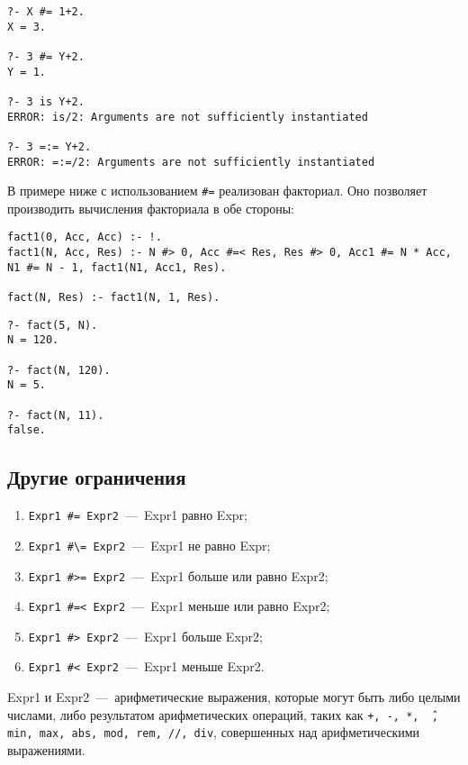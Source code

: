 \begin{lstlisting}[label=div,caption=Пример эквивалетности]
?- X #= 1+2.
X = 3.

?- 3 #= Y+2.
Y = 1.

?- 3 is Y+2.
ERROR: is/2: Arguments are not sufficiently instantiated

?- 3 =:= Y+2.
ERROR: =:=/2: Arguments are not sufficiently instantiated
\end{lstlisting}

В примере ниже с использованием \texttt{\#=} реализован факториал. Оно позволяет производить вычисления факториала в обе стороны:

\begin{lstlisting}[label=div,caption=Реализация факториала]
fact1(0, Acc, Acc) :- !.
fact1(N, Acc, Res) :- N #> 0, Acc #=< Res, Res #> 0, Acc1 #= N * Acc, N1 #= N - 1, fact1(N1, Acc1, Res).

fact(N, Res) :- fact1(N, 1, Res).
\end{lstlisting}

\begin{lstlisting}[label=div,caption=Примеры запросов]
?- fact(5, N).
N = 120.

?- fact(N, 120).
N = 5.

?- fact(N, 11).
false.
\end{lstlisting}

\subsection{Другие ограничения}
\begin{enumerate}
	\item \texttt{Expr1 \#= Expr2}~---~Expr1 равно Expr;
	\item \texttt{Expr1 \#\textbackslash= Expr2}~---~Expr1 не равно Expr;
	\item \texttt{Expr1 \#>= Expr2}~---~Expr1 больше или равно Expr2;
	\item \texttt{Expr1 \#=< Expr2}~---~Expr1 меньше или равно Expr2;
	\item \texttt{Expr1 \#> Expr2}~---~Expr1 больше Expr2;
	\item \texttt{Expr1 \#< Expr2}~---~Expr1 меньше Expr2.
\end{enumerate}

Expr1 и Expr2~---~арифметические выражения, которые могут быть либо целыми числами, либо результатом арифметических операций, таких как \texttt{+, -, *, \^ \,, min, max, abs, mod, rem, //, div}, совершенных над арифметическими выражениями.

